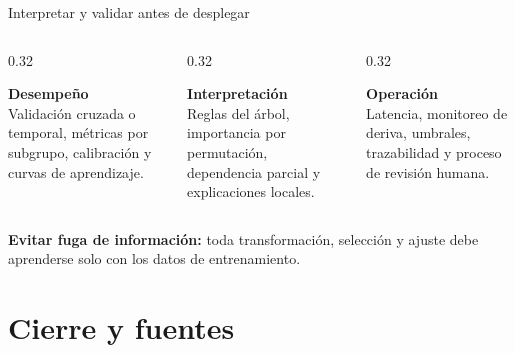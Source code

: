 \documentclass[aspectratio=169,11pt,table]{beamer}
\begin{document}
\begin{frame}{Interpretar y validar antes de desplegar}
\begin{columns}[T,onlytextwidth]
\begin{column}{0.32\textwidth}
\begin{ccdebox}
\centering
\textbf{Desempeño}\\[0.16cm]
\small
Validación cruzada o temporal, métricas por subgrupo, calibración y curvas de aprendizaje.
\end{ccdebox}
\end{column}
\begin{column}{0.32\textwidth}
\begin{ccdebox}
\centering
\textbf{Interpretación}\\[0.16cm]
\small
Reglas del árbol, importancia por permutación, dependencia parcial y explicaciones locales.
\end{ccdebox}
\end{column}
\begin{column}{0.32\textwidth}
\begin{ccdebox}
\centering
\textbf{Operación}\\[0.16cm]
\small
Latencia, monitoreo de deriva, umbrales, trazabilidad y proceso de revisión humana.
\end{ccdebox}
\end{column}
\end{columns}
\vspace{0.30cm}
\begin{keybox}
\centering
\textbf{Evitar fuga de información:} toda transformación, selección y ajuste debe aprenderse solo con los datos de entrenamiento.
\end{keybox}
\end{frame}

\section{Cierre y fuentes}
\end{document}
